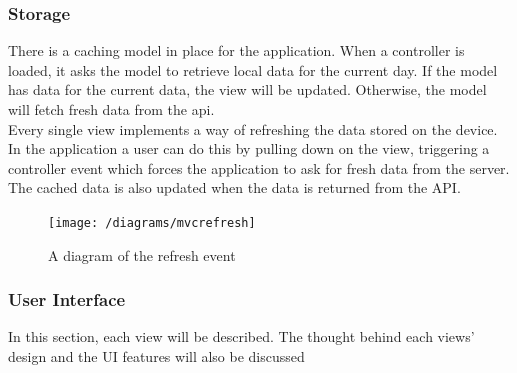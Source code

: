 \documentclass[preprint,12pt,3p]{elsarticle}
\begin{document}
\subsubsection{Storage}
There is a caching model in place for the application. When a controller is loaded, it asks the model to retrieve local data for the current day. If the model has data for the current data, the view will be updated. Otherwise, the model will fetch fresh data from the api.\\
Every single view implements a way of refreshing the data stored on the device. In the application a user can do this by pulling down on the view, triggering a controller event which forces the application to ask for fresh data from the server. The cached data is also updated when the data is returned from the API.

\begin{figure}[H]
    \centering
    \texttt{[image: /diagrams/mvcrefresh]}
    \caption {A diagram of the refresh event}
\end{figure}

\subsubsection{User Interface}
In this section, each view will be described. The thought behind each views' design and the UI features will also be discussed
\end{document}
